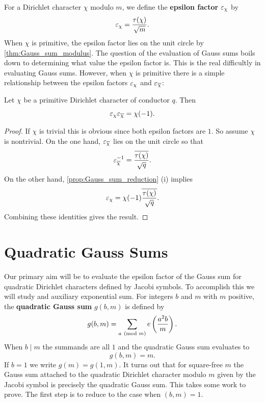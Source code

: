     For a Dirichlet character \(\chi\) modulo \(m\), we define the \textbf{epsilon factor} \(\varepsilon_{\chi}\) by
    \[
      \varepsilon_{\chi} = \frac{\tau(\chi)}{\sqrt{m}}.
    \]
    When \(\chi\) is primitive, the epsilon factor lies on the unit circle by \cref{thm:Gauss_sum_modulus}. The question of the evaluation of Gauss sums boils down to determining what value the epsilon factor is. This is the real difficultly in evaluating Gauss sums. However, when \(\chi\) is primitive there is a simple relationship between the epsilon factors \(\varepsilon_{\chi}\) and \(\varepsilon_{\overline{\chi}}\):

    \begin{proposition}\label{prop:epsilon_factor_relationship}
      Let \(\chi\) be a primitive Dirichlet character of conductor \(q\). Then
      \[
        \varepsilon_{\chi}\varepsilon_{\overline{\chi}} = \chi(-1).
      \]
    \end{proposition}
    \begin{proof}
      If \(\chi\) is trivial this is obvious since both epsilon factors are \(1\). So assume \(\chi\) is nontrivial. On the one hand, \(\varepsilon_{\overline{\chi}}\) lies on the unit circle so that
      \[
        \varepsilon_{\overline{\chi}}^{-1} = \frac{\overline{\tau(\chi)}}{{\sqrt{q}}}.
      \]
      On the other hand, \cref{prop:Gauss_sum_reduction} (i) implies
      \[
        \varepsilon_{\chi} = \chi(-1)\overline{\frac{\tau(\chi)}{\sqrt{q}}}.
      \]
      Combining these identities gives the result.
    \end{proof}
  \section{Quadratic Gauss Sums}
    Our primary aim will be to evaluate the epsilon factor of the Gauss sum for quadratic Dirichlet characters defined by Jacobi symbols. To accomplish this we will study and auxiliary exponential sum. For integers \(b\) and \(m\) with \(m\) positive, the \textbf{quadratic Gauss sum} \(g(b,m)\) is defined by
    \[
      g(b,m) = \sum_{a \ (\mathrm{mod}\text{ }m)}e\left(\frac{a^{2}b}{m}\right).
    \]
    When \(b \mid m\) the summands are all \(1\) and the quadratic Gauss sum evaluates to
    \[
      g(b,m) = m.
    \]
    If \(b = 1\) we write \(g(m) = g(1,m)\). It turns out that for square-free \(m\) the Gauss sum attached to the quadratic Dirichlet character modulo \(m\) given by the Jacobi symbol is precisely the quadratic Gauss sum. This takes some work to prove. The first step is to reduce to the case when \((b,m) = 1\).

